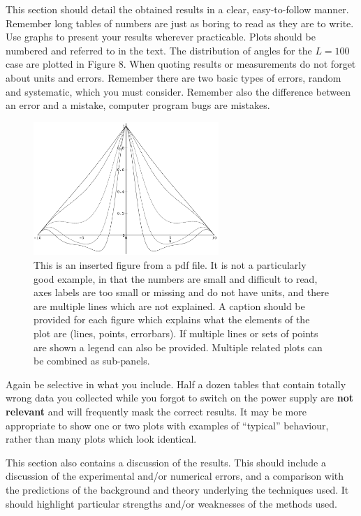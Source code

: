 \documentclass[a4paper,12pt]{article}
\begin{document}
This section should detail the obtained results in a clear,
easy-to-follow manner. Remember long tables of numbers are just as boring to
read as they are to write. Use graphs to present your results wherever 
practicable. Plots should be numbered and referred to in the text. 
The distribution of angles for the $L=100$ case are plotted in Figure 8.
When quoting results or measurements do not forget about units and errors. 
Remember there are two basic types of errors, random and systematic, 
which you must consider. Remember also the difference between an error 
and a mistake, computer program bugs are mistakes.
 
%
%
\begin{figure}[htb]     %
        \begin{center}
        \includegraphics[width=7cm]{example_plot.pdf}
        	\end{center}
	\caption{This is an inserted figure from a pdf file. It is not a particularly good example, in that the numbers are small and difficult to read, axes labels are too small or missing and do not have units, and there are multiple lines which are not explained. A caption should be provided for each figure which explains what the elements of the plot are (lines, points, errorbars). If multiple lines or sets of points are shown a legend can also be provided. Multiple related plots can be combined as sub-panels.}
\end{figure}

Again be selective in what you include. Half a dozen
tables that contain totally wrong data you collected while you forgot
to switch on the power supply are {\bf not relevant} and will frequently
mask the correct results. It may be more appropriate to show one or two 
plots with examples of ``typical'' behaviour, rather than many plots which 
look identical.

This section also contains a discussion of the results. This should
include a discussion of the experimental and/or numerical errors, and a
comparison with the predictions of the background and theory underlying
the techniques used. It should highlight particular strengths
and/or weaknesses of the methods used.
\end{document}
